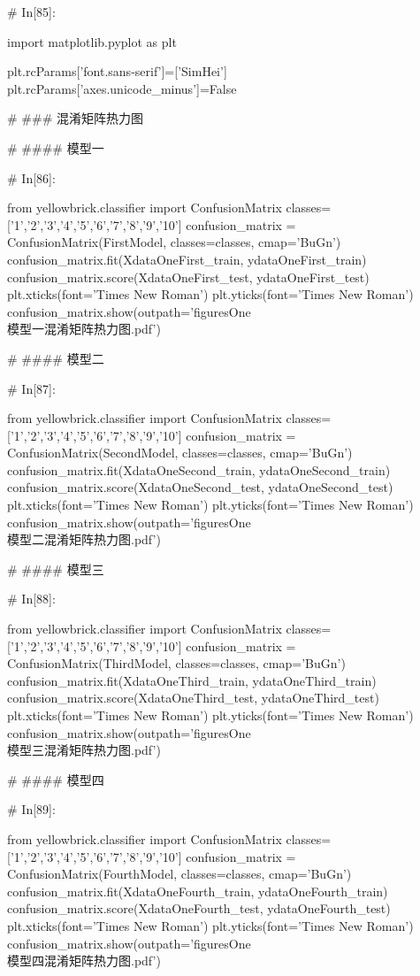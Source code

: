 \documentclass{MathorCupmodeling}
\begin{document}
\begin{python}
# In[85]:


import matplotlib.pyplot as plt

plt.rcParams['font.sans-serif']=['SimHei']
plt.rcParams['axes.unicode_minus']=False


# ### 混淆矩阵热力图

# #### 模型一

# In[86]:


from yellowbrick.classifier import ConfusionMatrix
classes=['1','2','3','4','5','6','7','8','9','10']
confusion_matrix = ConfusionMatrix(FirstModel, classes=classes, cmap='BuGn')
confusion_matrix.fit(XdataOneFirst_train, ydataOneFirst_train)
confusion_matrix.score(XdataOneFirst_test, ydataOneFirst_test)
plt.xticks(font='Times New Roman')
plt.yticks(font='Times New Roman')
confusion_matrix.show(outpath='figuresOne\\[附件1]模型一混淆矩阵热力图.pdf')


# #### 模型二

# In[87]:


from yellowbrick.classifier import ConfusionMatrix
classes=['1','2','3','4','5','6','7','8','9','10']
confusion_matrix = ConfusionMatrix(SecondModel, classes=classes, cmap='BuGn')
confusion_matrix.fit(XdataOneSecond_train, ydataOneSecond_train)
confusion_matrix.score(XdataOneSecond_test, ydataOneSecond_test)
plt.xticks(font='Times New Roman')
plt.yticks(font='Times New Roman')
confusion_matrix.show(outpath='figuresOne\\[附件1]模型二混淆矩阵热力图.pdf')


# #### 模型三

# In[88]:


from yellowbrick.classifier import ConfusionMatrix
classes=['1','2','3','4','5','6','7','8','9','10']
confusion_matrix = ConfusionMatrix(ThirdModel, classes=classes, cmap='BuGn')
confusion_matrix.fit(XdataOneThird_train, ydataOneThird_train)
confusion_matrix.score(XdataOneThird_test, ydataOneThird_test)
plt.xticks(font='Times New Roman')
plt.yticks(font='Times New Roman')
confusion_matrix.show(outpath='figuresOne\\[附件1]模型三混淆矩阵热力图.pdf')


# #### 模型四

# In[89]:


from yellowbrick.classifier import ConfusionMatrix
classes=['1','2','3','4','5','6','7','8','9','10']
confusion_matrix = ConfusionMatrix(FourthModel, classes=classes, cmap='BuGn')
confusion_matrix.fit(XdataOneFourth_train, ydataOneFourth_train)
confusion_matrix.score(XdataOneFourth_test, ydataOneFourth_test)
plt.xticks(font='Times New Roman')
plt.yticks(font='Times New Roman')
confusion_matrix.show(outpath='figuresOne\\[附件1]模型四混淆矩阵热力图.pdf')



\end{python}
\end{document}
